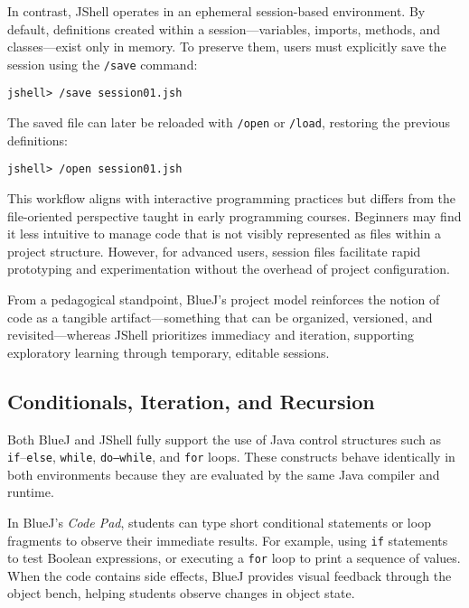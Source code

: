 \documentclass{article}
\begin{document}
In contrast, JShell operates in an ephemeral session-based environment. By default, definitions created within a session—variables, imports, methods, and classes—exist only in memory. To preserve them, users must explicitly save the session using the \texttt{/save} command:

\begin{lstlisting}
jshell> /save session01.jsh
\end{lstlisting}

The saved file can later be reloaded with \texttt{/open} or \texttt{/load}, restoring the previous definitions:

\begin{lstlisting}
jshell> /open session01.jsh
\end{lstlisting}

This workflow aligns with interactive programming practices but differs from the file-oriented perspective taught in early programming courses. Beginners may find it less intuitive to manage code that is not visibly represented as files within a project structure. However, for advanced users, session files facilitate rapid prototyping and experimentation without the overhead of project configuration.

From a pedagogical standpoint, BlueJ’s project model reinforces the notion of code as a tangible artifact—something that can be organized, versioned, and revisited—whereas JShell prioritizes immediacy and iteration, supporting exploratory learning through temporary, editable sessions.



\subsection{Conditionals, Iteration, and Recursion}

Both BlueJ and JShell fully support the use of Java control structures such as \texttt{if}–\texttt{else}, \texttt{while}, \texttt{do–while}, and \texttt{for} loops. These constructs behave identically in both environments because they are evaluated by the same Java compiler and runtime.

In BlueJ’s \textit{Code Pad}, students can type short conditional statements or loop fragments to observe their immediate results. For example, using \texttt{if} statements to test Boolean expressions, or executing a \texttt{for} loop to print a sequence of values. When the code contains side effects, BlueJ provides visual feedback through the object bench, helping students observe changes in object state.
\end{document}
